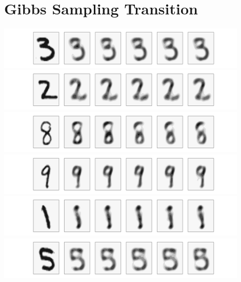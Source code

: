 \documentclass[a4paper,onecolumn]{article}
\theoremstyle{remark}
\begin{document}
\section{Gibbs Sampling Transition}
\begin{center}
    \includegraphics[width=12cm]{png/1.png}\\
    \includegraphics[width=12cm]{png/2.png}\\
    \includegraphics[width=12cm]{png/3.png}\\
    \includegraphics[width=12cm]{png/4.png}\\
    \includegraphics[width=12cm]{png/5.png}\\
    \includegraphics[width=12cm]{png/6.png}
\end{center}
\end{document}
